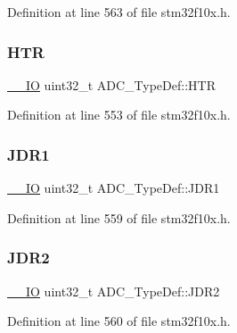 Definition at line 563 of file stm32f10x.\+h.

\mbox{\label{struct_a_d_c___type_def_a297ac2d83a1837bfdc0333474b977de0}} 
\subsubsection{\texorpdfstring{H\+TR}{HTR}}
{\footnotesize\ttfamily \hyperlink{core__sc300_8h_aec43007d9998a0a0e01faede4133d6be}{\+\_\+\+\_\+\+IO} uint32\+\_\+t A\+D\+C\+\_\+\+Type\+Def\+::\+H\+TR}



Definition at line 553 of file stm32f10x.\+h.

\mbox{\label{struct_a_d_c___type_def_ab4b0a79a9e4a9d5b0a24d7285cf55bdc}} 
\subsubsection{\texorpdfstring{J\+D\+R1}{JDR1}}
{\footnotesize\ttfamily \hyperlink{core__sc300_8h_aec43007d9998a0a0e01faede4133d6be}{\+\_\+\+\_\+\+IO} uint32\+\_\+t A\+D\+C\+\_\+\+Type\+Def\+::\+J\+D\+R1}



Definition at line 559 of file stm32f10x.\+h.

\mbox{\label{struct_a_d_c___type_def_a898b87cab4f099bcca981cc4c9318b51}} 
\subsubsection{\texorpdfstring{J\+D\+R2}{JDR2}}
{\footnotesize\ttfamily \hyperlink{core__sc300_8h_aec43007d9998a0a0e01faede4133d6be}{\+\_\+\+\_\+\+IO} uint32\+\_\+t A\+D\+C\+\_\+\+Type\+Def\+::\+J\+D\+R2}



Definition at line 560 of file stm32f10x.\+h.

\mbox{\label{struct_a_d_c___type_def_a40999cd0a255ef62b2340e2726695063}} 
